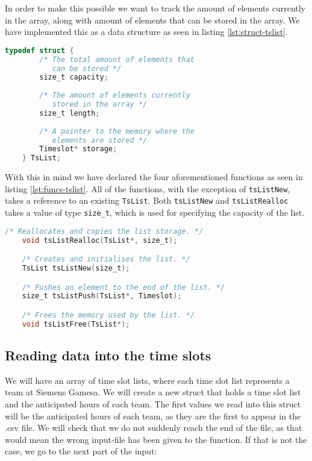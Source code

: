 In order to make this possible we want to track the amount of elements currently in the array, along with amount of elements that can be stored in the array. We have implemented this as a data structure as seen in listing \ref{lst:struct-tslist}.
\begin{lstlisting}[caption={Definition of the list structure},label={lst:struct-tslist},language=C]
    typedef struct {
        /* The total amount of elements that
           can be stored */
        size_t capacity;
        
        /* The amount of elements currently
           stored in the array */
        size_t length;
        
        /* A pointer to the memory where the
           elements are stored */
        Timeslot* storage;
    } TsList;
\end{lstlisting}
With this in mind we have declared the four aforementioned functions as seen in listing \ref{lst:funcs-tslist}. All of the functions, with the exception of \verb|tsListNew|, takes a reference to an existing \verb|TsList|. Both \verb|tsListNew| and \verb|tsListRealloc| takes a value of type \verb|size_t|, which is used for specifying the capacity of the list.
\begin{lstlisting}[caption={Declarations of TsList functions.},label={lst:funcs-tslist},language=C]
    /* Reallocates and copies the list storage. */
    void tsListRealloc(TsList*, size_t);

    /* Creates and initialises the list. */
    TsList tsListNew(size_t);

    /* Pushes an element to the end of the list. */
    size_t tsListPush(TsList*, Timeslot);

    /* Frees the memory used by the list. */
    void tsListFree(TsList*);

\end{lstlisting}

\subsection{Reading data into the time slots}
We will have an array of time slot lists, where each time slot list represents a team at Siemens Gamesa. We will create a new struct that holds a time slot list and the anticipated hours of each team. The first values we read into this struct will be the anticipated hours of each team, as they are the first to appear in the .csv file. We will check that we do not suddenly reach the end of the file, as that would mean the wrong input-file has been given to the function. If that is not the case, we go to the next part of the input:

